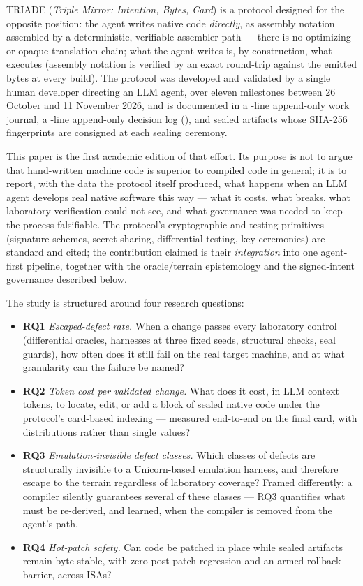 \documentclass[11pt,a4paper]{article}
\newcommand{\RQ}[1]{\textbf{RQ#1}}
\begin{document}
TRIADE (\emph{Triple Mirror: Intention, Bytes, Card}) is a protocol
designed for the opposite position: the agent writes native code
\emph{directly}, as assembly notation assembled by a deterministic,
verifiable assembler path --- there is no optimizing or opaque translation
chain; what the agent writes is, by construction, what executes
(assembly notation is verified by an exact round-trip against the emitted
bytes at every build). The protocol was developed and validated by a
single human developer directing an LLM agent, over eleven milestones
between 26 October and 11 November 2026, and is documented in a
\nbLignesJournal-line append-only work journal, a \nbLignesDecisions-line
append-only decision log (\plageDecisions), and sealed artifacts whose
SHA-256 fingerprints are consigned at each sealing ceremony.

This paper is the first academic edition of that effort. Its purpose is
not to argue that hand-written machine code is superior to compiled code
in general; it is to report, with the data the protocol itself produced,
what happens when an LLM agent develops real native software this way ---
what it costs, what breaks, what laboratory verification could not see,
and what governance was needed to keep the process falsifiable. The
protocol's cryptographic and testing primitives (signature schemes,
secret sharing, differential testing, key ceremonies) are standard and
cited; the contribution claimed is their \emph{integration} into one
agent-first pipeline, together with the oracle/terrain epistemology and
the signed-intent governance described below.

The study is structured around four research questions:

\begin{itemize}
\item \RQ{1} \emph{Escaped-defect rate.} When a change passes every
laboratory control (differential oracles, harnesses at three fixed seeds,
structural checks, seal guards), how often does it still fail on the real
target machine, and at what granularity can the failure be named?
\item \RQ{2} \emph{Token cost per validated change.} What does it cost,
in LLM context tokens, to locate, edit, or add a block of sealed native
code under the protocol's card-based indexing --- measured end-to-end
on the final card, with distributions rather than single values?
\item \RQ{3} \emph{Emulation-invisible defect classes.} Which classes of
defects are structurally invisible to a Unicorn-based emulation harness,
and therefore escape to the terrain regardless of laboratory coverage?
Framed differently: a compiler silently guarantees several of these
classes --- RQ3 quantifies what must be re-derived, and learned, when the
compiler is removed from the agent's path.
\item \RQ{4} \emph{Hot-patch safety.} Can code be patched in place while
sealed artifacts remain byte-stable, with zero post-patch regression and
an armed rollback barrier, across ISAs?
\end{itemize}
\end{document}
